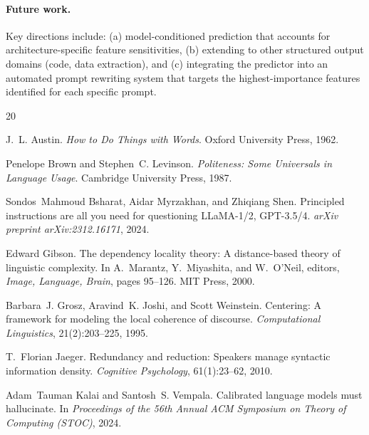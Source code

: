 \documentclass{article}
\begin{document}
\paragraph{Future work.}
Key directions include: (a) model-conditioned prediction that accounts for architecture-specific feature sensitivities, (b) extending to other structured output domains (code, data extraction), and (c) integrating the predictor into an automated prompt rewriting system that targets the highest-importance features identified for each specific prompt.





\begin{thebibliography}{20}

J.~L. Austin.
\newblock \emph{How to Do Things with Words}.
\newblock Oxford University Press, 1962.

Penelope Brown and Stephen~C. Levinson.
\newblock \emph{Politeness: Some Universals in Language Usage}.
\newblock Cambridge University Press, 1987.

Sondos~Mahmoud Bsharat, Aidar Myrzakhan, and Zhiqiang Shen.
\newblock Principled instructions are all you need for questioning {LLaMA-1/2}, {GPT-3.5/4}.
\newblock \emph{arXiv preprint arXiv:2312.16171}, 2024.

Edward Gibson.
\newblock The dependency locality theory: A distance-based theory of linguistic complexity.
\newblock In A.~Marantz, Y.~Miyashita, and W.~O'Neil, editors, \emph{Image, Language, Brain}, pages 95--126. MIT Press, 2000.

Barbara~J. Grosz, Aravind~K. Joshi, and Scott Weinstein.
\newblock Centering: A framework for modeling the local coherence of discourse.
\newblock \emph{Computational Linguistics}, 21(2):203--225, 1995.

T.~Florian Jaeger.
\newblock Redundancy and reduction: Speakers manage syntactic information density.
\newblock \emph{Cognitive Psychology}, 61(1):23--62, 2010.

Adam~Tauman Kalai and Santosh~S. Vempala.
\newblock Calibrated language models must hallucinate.
\newblock In \emph{Proceedings of the 56th Annual ACM Symposium on Theory of Computing (STOC)}, 2024.


\end{thebibliography}
\end{document}
